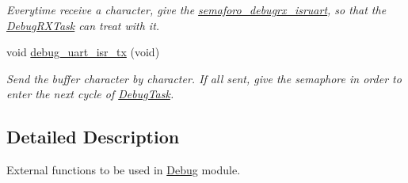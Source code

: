\begin{DoxyCompactItemize}
\begin{DoxyCompactList}\small\item\em Everytime receive a character, give the \hyperlink{group___debug___private___variables_gaeefc3248920a99b9436147de4aeff800}{semaforo\+\_\+debugrx\+\_\+isruart}, so that the \hyperlink{group___debug___exported___functions___group2_ga8013ff117a9e96e630d30771cf9b0199}{Debug\+R\+X\+Task} can treat with it. \end{DoxyCompactList}\item 
void \hyperlink{group___debug___u_a_r_t___external___functions_gaee765dd75f3414ade869071798ff33f4}{debug\+\_\+uart\+\_\+isr\+\_\+tx} (void)\hypertarget{group___debug___u_a_r_t___external___functions_gaee765dd75f3414ade869071798ff33f4}{}\label{group___debug___u_a_r_t___external___functions_gaee765dd75f3414ade869071798ff33f4}

\begin{DoxyCompactList}\small\item\em Send the buffer character by character. If all sent, give the semaphore in order to enter the next cycle of \hyperlink{group___debug___exported___functions___group2_ga0e7fca846e34e06a1f62249fe8a30a44}{Debug\+Task}. \end{DoxyCompactList}\end{DoxyCompactItemize}


\subsection{Detailed Description}
External functions to be used in \hyperlink{group___debug}{Debug} module. 

